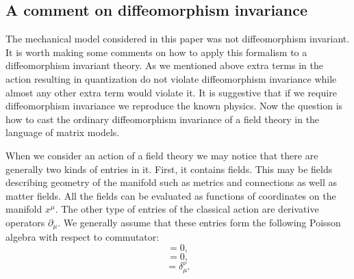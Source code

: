 \documentclass[a4paper,11pt]{article}
\begin{document}
\subsection*{A comment on diffeomorphism invariance}
The mechanical model considered in this paper was not
diffeomorphism invariant. It is worth making some comments on how
to apply this formalism to a diffeomorphism invariant theory. As
we mentioned above extra terms in the action resulting in
quantization do not violate diffeomorphism invariance while almost
any other extra term would violate it. It is suggestive that if we
require diffeomorphism invariance we reproduce the known physics.
Now the question is how to cast the ordinary diffeomorphism
invariance of a field theory in the language of matrix models.


When we consider an action of a field theory we may notice that
there are generally two kinds of entries in it. First, it contains
fields. This may be fields describing geometry of the manifold
such as metrics and connections as well as  matter fields. All the
fields can be evaluated as functions of coordinates on the
manifold $x^{\mu}$. The other type of entries of the classical
action are derivative operators $\partial_\mu$. We generally
assume that these entries form the following Poisson algebra with
respect to commutator:
\begin{equation}
[x^\mu,x^\nu]=0, \label{pa1}
\end{equation}
\begin{equation}
[\partial_\mu,\partial_\nu]=0, \label{pa2}
\end{equation}
\begin{equation}
[\partial_\mu,x^\nu]=\delta_\mu^\nu. \label{pa3}
\end{equation}
\end{document}
